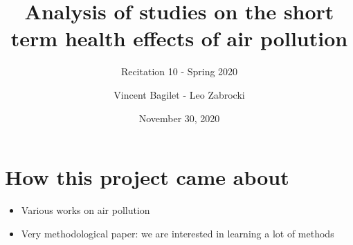 \documentclass[
]{article}
\title{}
\title{Analysis of studies on the short term health effects of air pollution}
\subtitle{Recitation 10 - Spring 2020}
\author{Vincent Bagilet - Leo Zabrocki}
\date{November 30, 2020}
\begin{document}
\maketitle

\hypertarget{how-this-project-came-about}{%
\section{How this project came
about}\label{how-this-project-came-about}}

\begin{itemize}
\item
  Various works on air pollution
\item
  Very methodological paper: we are interested in learning a lot of
  methods
\end{itemize}
\end{document}
